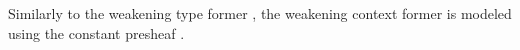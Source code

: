 Similarly to the weakening type former , the weakening context former  is modeled using the constant presheaf .
\begin{code}%
\>[0]\AgdaSpace{}%
\AgdaSymbol{:}\AgdaSpace{}%
\AgdaSpace{}%
\AgdaSpace{}%
\AgdaSpace{}%
\AgdaSpace{}%
\<%
\\
\>[0]\AgdaSpace{}%
\AgdaSpace{}%
\AgdaSymbol{=}\AgdaSpace{}%
\AgdaSpace{}%
\<%
\end{code}
